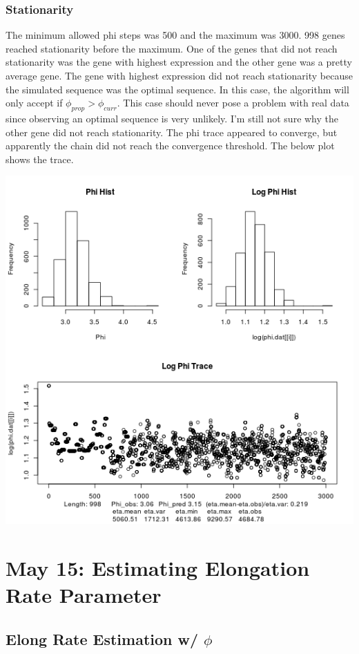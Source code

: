 \documentclass{article}
\begin{document}
 	\subsubsection{Stationarity}
 	
 	The minimum allowed phi steps was 500 and the maximum was 3000. 998 genes reached stationarity before the maximum. One of the genes that did not reach stationarity was the gene with highest expression and the other gene was a pretty average gene. The gene with highest expression did not reach stationarity because the simulated sequence was the optimal sequence. In this case, the algorithm will only accept if $\phi_{prop} > \phi_{curr}$. This case should never pose a problem with real data since observing an optimal sequence is very unlikely. I'm still not sure why the other gene did not reach stationarity. The phi trace appeared to converge, but apparently the chain did not reach the convergence threshold. The below plot shows the trace. 
 	
 	\includegraphics[scale=0.5]{../1000_test/scuo_conv/hist/999_phi_hist.png}
\newpage
 \section{May 15: Estimating Elongation Rate Parameter}

	\subsection{Elong Rate Estimation w/ $\phi$}
 
\end{document}
